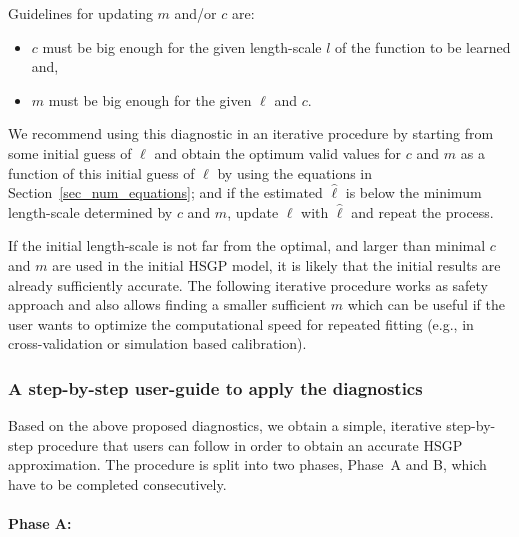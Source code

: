 Guidelines for updating $m$ and/or $c$ are:
%
\begin{itemize}
	\item $c$ must be big enough for the given length-scale $l$ of the function to be learned and,
	\item $m$ must be big enough for the given $\ell$ and $c$. 
\end{itemize}

We recommend using this diagnostic in an iterative procedure by starting from some initial guess of $\ell$ and obtain the optimum valid values for $c$ and $m$ as a function of this initial guess of $\ell$ by using the equations in Section~\ref{sec_num_equations}; and if the estimated $\hat{\ell}$ is below the minimum length-scale determined by $c$ and $m$, update $\ell$ with $\hat{\ell}$ and repeat the process. 

If the initial length-scale is not far from the optimal, and larger than minimal $c$ and $m$ are used in the initial HSGP model, it is likely that the initial results are already sufficiently accurate. The following iterative procedure works as safety approach and also allows finding a smaller sufficient $m$ which can be useful if the user wants to optimize the computational speed for repeated fitting (e.g., in cross-validation or simulation based calibration).


\subsubsection{A step-by-step user-guide to apply the diagnostics} \label{sec_user_guide}

Based on the above proposed diagnostics, we obtain a simple, iterative step-by-step procedure that users can follow in order to obtain an accurate HSGP approximation. The procedure is split into two phases, Phase~A and B, which have to be completed consecutively.

\paragraph*{Phase A:}

